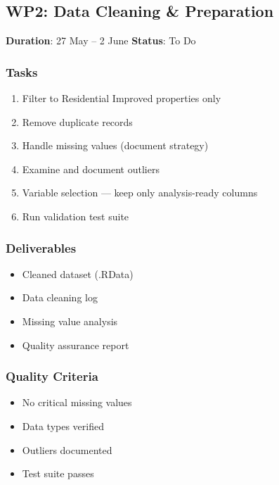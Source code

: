 \documentclass[
  english,
  letterpaper,
  DIV=11,
  numbers=noendperiod]{scrreprt}
\providecommand{\tightlist}{%
  \setlength{\itemsep}{0pt}\setlength{\parskip}{0pt}}
\begin{document}
\subsection{WP2: Data Cleaning \&
Preparation}\label{wp2-data-cleaning-preparation}

\textbf{Duration}: 27 May -- 2 June \textbar{} \textbf{Status}: To Do

\subsubsection{Tasks}\label{tasks-2}

\begin{enumerate}
\def\labelenumi{\arabic{enumi}.}
\tightlist
\item
  Filter to Residential Improved properties only
\item
  Remove duplicate records
\item
  Handle missing values (document strategy)
\item
  Examine and document outliers
\item
  Variable selection --- keep only analysis-ready columns
\item
  Run validation test suite
\end{enumerate}

\subsubsection{Deliverables}\label{deliverables-2}

\begin{itemize}
\tightlist
\item
  Cleaned dataset (.RData)
\item
  Data cleaning log
\item
  Missing value analysis
\item
  Quality assurance report
\end{itemize}

\subsubsection{Quality Criteria}\label{quality-criteria-1}

\begin{itemize}
\tightlist
\item[$\square$]
  No critical missing values
\item[$\square$]
  Data types verified
\item[$\square$]
  Outliers documented
\item[$\square$]
  Test suite passes
\end{itemize}
\end{document}
